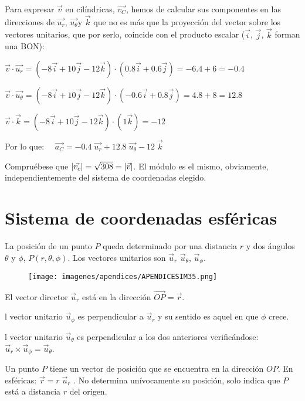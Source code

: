 \vspace{2mm}Para expresar $\vec v$ en cilíndricas, $\vec {v_C}$, hemos de calcular sus componentes en las direcciones de $\overrightarrow{u_r}$, $\overrightarrow{u_{\theta}}$y $\vec k$  que no es más que la proyección del vector sobre los vectores unitarios, que por serlo, coincide con el producto escalar ($\vec i$, $\vec j$, $\vec k$ forman una BON):

\vspace{2mm} $\vec v \cdot \vec {u_r}=(-8\vec i +10\vec j-12 \vec k)\cdot (0.8\vec i + 0.6 \vec j)=-6.4+6=-0.4$

$\vec v \cdot \vec {u_{\theta}}=(-8\vec i +10\vec j-12 \vec k)\cdot (-0.6\vec i + 0.8 \vec j)=4.8+8=12.8$

$\vec v \cdot \vec k=(-8\vec i +10\vec j-12 \vec k)\cdot (1\vec k)=-12$


Por lo que: $\quad \vec {a_C}=-0.4\; \vec {u_r}+12.8\; \vec {u_{\theta}}-12\; \vec k$

Compruébese que $\abs{\vec {v_c}}=\sqrt{308}=\abs{\vec v}$. El módulo es el mismo, obviamente, independientemente del sistema de coordenadas elegido.

\section{Sistema de coordenadas esféricas}
La posición de un punto $P$ queda determinado por una distancia $r$ y dos ángulos $\theta$ y $\phi$, $P(r,\theta,\phi)$.  Los vectores unitarios son $\vec u_{r}$ $\vec u_{\theta}$, $\vec u_{\phi}$.

\begin{figure}[H]
	\centering
	\texttt{[image: imagenes/apendices/APENDICESIM35.png]}
\end{figure}


El vector director $\vec u_{r}$ está en la dirección $\overrightarrow{OP}=\vec r$.

l vector unitario $\vec u_{\phi}$ es perpendicular a $\vec u_{r}$ y su sentido es aquel en que $\phi$ crece.

l vector unitario $\vec u_{\theta}$ es perpendicular a los dos anteriores verificándose: $\vec u_{r} \times \vec u_{\phi} = \vec u_{\theta}$.

Un punto $P$ tiene un vector de posición que se encuentra en la dirección $OP$. En esféricas: $\vec r=r\; \vec u_r$ . No determina unívocamente su posición, solo indica que $P$ está a distancia $r$ del origen.


